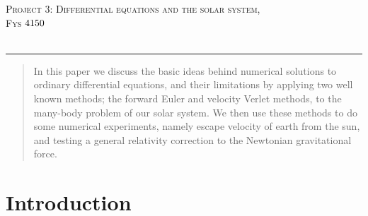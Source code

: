 \documentclass[a4paper,11pt]{article}
\newcommand*{\boisik}{\fontfamily{bsk}\selectfont} %
\begin{document}
{
\SetBgVshift{-1.2cm}
\SetBgHshift{-10.5cm}
$$\:$$
\begin{center}
	\vspace{0.2cm}%
	\fontsize{15}{15}\selectfont \textsc{ Project 3: Differential equations and the solar system},\\
	\fontsize{13}{13}\selectfont \textsc{Fys $\textnormal{{4150}}$ }\\
	\vspace{0.4cm}
	\fontsize{12}{12}\\
	\vspace{0.5cm}
\end{center}
	
\rule{\textwidth}{0.3pt}\par
		
\begin{abstract}
	In this paper we discuss the basic ideas behind numerical solutions to ordinary differential equations, and their limitations by applying two well known methods; the forward Euler and velocity Verlet methods, to the many-body problem of our solar system. We then use these methods to do some numerical experiments, namely escape velocity of earth from the sun, and testing a general relativity correction to the Newtonian gravitational force.
\end{abstract}



		
\section*{Introduction}

}
\end{document}
